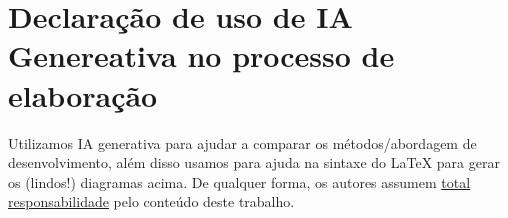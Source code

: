 \documentclass[12pt,a4paper]{article}
\begin{document}
\section{Declaração de uso de IA Genereativa no processo de elaboração}
Utilizamos IA generativa para ajudar a comparar os métodos/abordagem de desenvolvimento, além disso usamos para ajuda na sintaxe do LaTeX para gerar os (lindos!) diagramas acima. De qualquer forma, os autores assumem \underline{total responsabilidade} pelo conteúdo deste trabalho.
\end{document}
